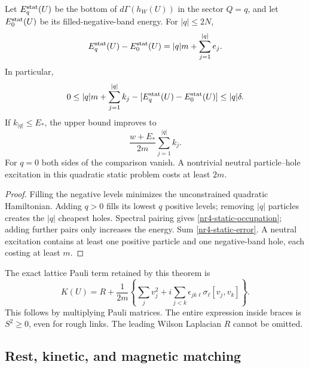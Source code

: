 \begin{corollary}
\label{nr4-static-charge}
Let $E_q^{\rm stat}(U)$ be the bottom of $d\Gamma(h_W(U))$ in the
sector $Q=q$, and let $E_0^{\rm stat}(U)$ be its filled-negative-band
energy. For $|q|\le2N$,
\begin{equation}
 E_q^{\rm stat}(U)-E_0^{\rm stat}(U)
 =|q|m+\sum_{j=1}^{|q|}e_j.
 \label{nr4-static-occupation}
\end{equation}
In particular,
\begin{equation}
 0\le |q|m+\sum_{j=1}^{|q|}k_j
        -[E_q^{\rm stat}(U)-E_0^{\rm stat}(U)]\le |q|\delta.
 \label{nr4-static-charge-error}
\end{equation}
If $k_{|q|}\le E_*$, the upper bound improves to
\begin{equation}
 \frac{w+E_*}{2m}\sum_{j=1}^{|q|}k_j.
 \label{nr4-low-window}
\end{equation}
For $q=0$ both sides of the comparison vanish. A nontrivial neutral
particle--hole excitation in this quadratic static problem costs at
least $2m$.
\end{corollary}
\begin{proof}
Filling the negative levels minimizes the unconstrained quadratic
Hamiltonian. Adding $q>0$ fills its lowest $q$ positive levels;
removing $|q|$ particles creates the $|q|$ cheapest holes. Spectral
pairing gives \eqref{nr4-static-occupation}; adding further pairs only
increases the energy. Sum \eqref{nr4-static-error}. A neutral excitation
contains at least one positive particle and one negative-band hole,
each costing at least $m$.
\end{proof}

The exact lattice Pauli term retained by this theorem is
\begin{equation}
 K(U)=R+\frac1{2m}\left\{\sum_jv_j^2+
 i\sum_{j<k}\epsilon_{jk\ell}\sigma_\ell[v_j,v_k]\right\}.
 \label{nr4-pauli}
\end{equation}
This follows by multiplying Pauli matrices. The entire expression
inside braces is $S^2\ge0$, even for rough links. The leading Wilson
Laplacian $R$ cannot be omitted.

\subsection{Rest, kinetic, and magnetic matching}
\label{nr4-matching}

